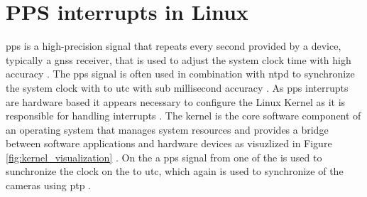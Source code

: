 \section{PPS interrupts in Linux}
\gls{pps} is a high-precision signal that repeats every second provided by a device, typically a \gls{gnss} receiver, that is used to adjust the system clock time with high accuracy \cite{giomettiLinuxPPSWikiLinuxPPS2007}.
The \gls{pps} signal is often used in combination with \gls{ntpd} to synchronize the system clock with to \gls{utc} with sub millisecond accuracy \cite{giomettiLinuxPPSWikiLinuxPPS2007}.
As \gls{pps} interrupts are hardware based it appears necessary to configure the Linux Kernel as it is responsible for handling interrupts \cite{giomettiLinuxPPSWikiLinuxPPS2007}.
The kernel is the core software component of an operating system that manages system resources and provides a bridge between software applications and hardware devices as visuzlized in Figure \ref{fig:kernel_visualization} \cite{thekerneldevelopmentcommunityInterruptsLinuxKernel}.
On the \sr a \gls{pps} signal from one of the  is used to sunchronize the clock on the \jx to \gls{utc}, which again is used to synchronize of the cameras using \gls{ptp} \cite{martensPortableSensorRig2022}.